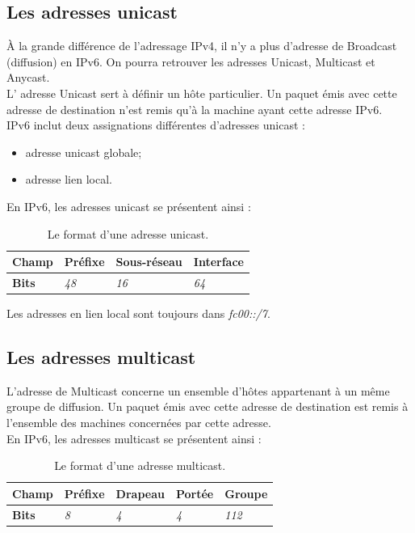 \subsection{Les adresses unicast}
À la grande différence de l'adressage IPv4, il n'y a plus d'adresse de Broadcast (diffusion) en IPv6.
On pourra retrouver les adresses Unicast, Multicast et Anycast.\\

L' adresse Unicast sert à définir un hôte particulier. Un paquet émis avec cette adresse de destination n'est remis qu'à la machine ayant cette adresse IPv6.\\

IPv6 inclut deux assignations différentes d'adresses unicast :
\begin{itemize}
\item adresse unicast globale;
\item adresse lien local.
\end{itemize}
  
En IPv6, les adresses unicast se présentent ainsi :

\begin{table}[!h]
  \centering
  \begin{tabular}{|l|l|l|l|} 
   \hline
    \textbf{Champ} & Préfixe & Sous-réseau & Interface \\
    \hline
    \textbf{Bits} & \textit{48} & \textit{16} & \textit{64} \\
    \hline
  \end{tabular}
  \caption{Le format d'une adresse unicast. \cite{OracleUnicast}}
\end{table}

Les adresses en lien local sont toujours dans \textit{fc00::/7}.

\subsection{Les adresses multicast}\label{sc:@multicast}

L'adresse de Multicast concerne un ensemble d'hôtes appartenant à un même groupe de diffusion. Un paquet émis avec cette adresse de destination est remis à l'ensemble des machines concernées par cette adresse.\\

En IPv6, les adresses multicast se présentent ainsi :

\begin{table}[!h]
  \centering
  \begin{tabular}{|l|l|l|l|l|} 
   \hline
    \textbf{Champ} & Préfixe & Drapeau & Portée & Groupe \\
    \hline
    \textbf{Bits} & \textit{8} & \textit{4} & \textit{4} & \textit{112} \\
    \hline
  \end{tabular}
  \caption{Le format d'une adresse multicast. \cite{OracleMulticast}}
\end{table}

